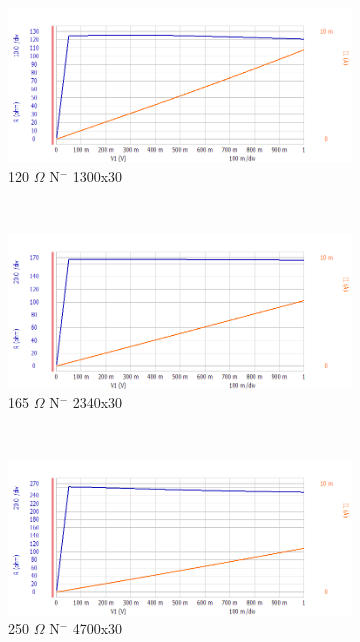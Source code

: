 \documentclass[letter,12pt]{article}
\begin{document}
\begin{figure}[h!]
				~
				\begin{subfigure}[b]{.45\textwidth}
					\includegraphics[width=\textwidth]{./Images/Probe_Test/R_Tub_1300x30.png}
					\caption{120 $\Omega$ N$^-$ 1300x30}
				\end{subfigure}
				~
				\begin{subfigure}[b]{.45\textwidth}
					\includegraphics[width=\textwidth]{./Images/Probe_Test/R_Tub_2340x30.png}
					\caption{165 $\Omega$ N$^-$ 2340x30}
				\end{subfigure}
				~
				\begin{subfigure}[b]{.45\textwidth}
					\includegraphics[width=\textwidth]{./Images/Probe_Test/R_Tub_4700x30.png}
					\caption{250 $\Omega$ N$^-$ 4700x30}
				\end{subfigure}
				~
				\begin{subfigure}[b]{.45\textwidth}

\end{subfigure}
\end{figure}
\end{document}
